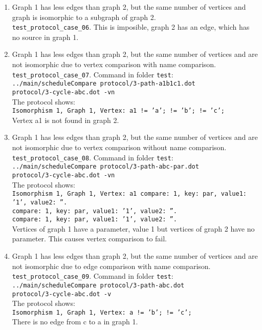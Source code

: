 \documentclass[12pt,a4paper]{report}
\begin{document}
\begin{enumerate}
  \item Graph 1 has less edges than graph 2, but the same number of vertices and graph is isomorphic to a subgraph of graph 2. \\
    \texttt{test\_protocol\_case\_06}. This is imposible, graph 2 has an edge, which has no source in graph 1.
  \item Graph 1 has less edges than graph 2, but the same number of vertices and are not isomorphic due to vertex comparison with name comparison.
    \texttt{test\_protocol\_case\_07}. Command in folder \texttt{test}: \\
    \texttt{../main/scheduleCompare protocol/3-path-a1b1c1.dot \\ protocol/3-cycle-abc.dot -vn} \\
    The protocol shows: \\
    \texttt{Isomorphism 1, Graph 1, Vertex: a1 != 'a'; != 'b'; != 'c';} \\
    Vertex a1 is not found in graph 2.
  \item Graph 1 has less edges than graph 2, but the same number of vertices and are not isomorphic due to vertex comparison without name comparison.
    \texttt{test\_protocol\_case\_08}. Command in folder \texttt{test}: \\
    \texttt{../main/scheduleCompare protocol/3-path-abc-par.dot \\ protocol/3-cycle-abc.dot -vn} \\
    The protocol shows: \\
    \texttt{Isomorphism 1, Graph 1, Vertex: a1 compare: 1, key: par, value1: '1', value2: ''. \\
    compare: 1, key: par, value1: '1', value2: ''. \\
    compare: 1, key: par, value1: '1', value2: ''.} \\
    Vertices of graph 1 have a parameter, value 1 but vertices of graph 2 have no parameter. This causes vertex comparison to fail.
  \item Graph 1 has less edges than graph 2, but the same number of vertices and are not isomorphic due to edge comparison with name comparison.
    \texttt{test\_protocol\_case\_09}. Command in folder \texttt{test}: \\
    \texttt{../main/scheduleCompare protocol/3-path-abc.dot \\ protocol/3-cycle-abc.dot -v} \\
    The protocol shows: \\
    \texttt{Isomorphism 1, Graph 1, Vertex: a != 'b'; != 'c';} \\
    There is no edge from c to a in graph 1. 


\end{enumerate}
\end{document}
